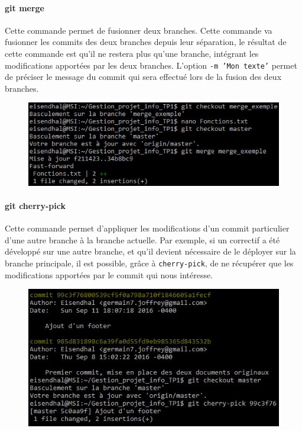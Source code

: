 \documentclass[11pt,canadien]{article}
\begin{document}
\paragraph{git merge}Cette commande permet de fusionner deux branches. Cette commande va fusionner les commits des deux branches depuis leur séparation, le résultat de cette commande est qu'il ne restera plus qu'une branche, intégrant les modifications apportées par les deux branches. L'option \texttt{-m 'Mon texte'} permet de préciser le message du commit qui sera effectué lors de la fusion des deux branches.
\begin{figure}[H]
	\centering
	\includegraphics[width=\textwidth]{images/git_merge.jpg}
\end{figure}

\paragraph{git cherry-pick}Cette commande permet d'appliquer les modifications d'un commit particulier d'une autre branche à la branche actuelle. Par exemple, si un correctif a été développé sur une autre branche, et qu'il devient nécessaire de le déployer sur la branche principale, il est possible, grâce à \texttt{cherry-pick}, de ne récupérer que les modifications apportées par le commit qui nous intéresse.
\begin{figure}[H]
	\centering
	\includegraphics[width=\textwidth]{images/git_cherry-pick.jpg}
\end{figure}
\end{document}
